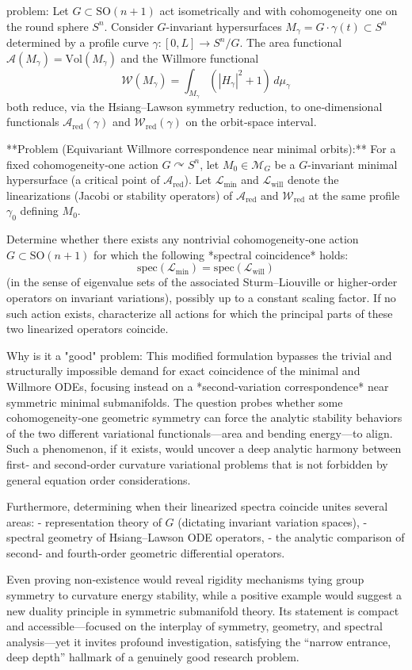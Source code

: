 problem:  
Let \(G \subset \mathrm{SO}(n+1)\) act isometrically and with cohomogeneity one on the round sphere \(S^n\).  
Consider \(G\)-invariant hypersurfaces \(M_\gamma = G\cdot \gamma(t)\subset S^n\) determined by a profile curve \(\gamma: [0,L]\to S^n/G\).  
The area functional \(\mathcal{A}(M_\gamma)=\mathrm{Vol}(M_\gamma)\) and the Willmore functional  
\[
\mathcal{W}(M_\gamma)=\int_{M_\gamma} (|H_\gamma|^2+1)\, d\mu_\gamma
\]
both reduce, via the Hsiang–Lawson symmetry reduction, to one‑dimensional functionals \(\mathcal{A}_\mathrm{red}(\gamma)\) and \(\mathcal{W}_\mathrm{red}(\gamma)\) on the orbit‑space interval.

**Problem (Equivariant Willmore correspondence near minimal orbits):**  
For a fixed cohomogeneity‑one action \(G\curvearrowright S^n\), let \(M_0 \in \mathcal{M}_G\) be a \(G\)-invariant minimal hypersurface (a critical point of \(\mathcal{A}_\mathrm{red}\)).  
Let \(\mathcal{L}_\mathrm{min}\) and \(\mathcal{L}_\mathrm{will}\) denote the linearizations (Jacobi or stability operators) of \(\mathcal{A}_\mathrm{red}\) and \(\mathcal{W}_\mathrm{red}\) at the same profile \(\gamma_0\) defining \(M_0\).

Determine whether there exists any nontrivial cohomogeneity‑one action \(G\subset \mathrm{SO}(n+1)\) for which the following *spectral coincidence* holds:
\[
\mathrm{spec}(\mathcal{L}_\mathrm{min}) = \mathrm{spec}(\mathcal{L}_\mathrm{will})
\]
(in the sense of eigenvalue sets of the associated Sturm–Liouville or higher‑order operators on invariant variations), possibly up to a constant scaling factor.  
If no such action exists, characterize all actions for which the principal parts of these two linearized operators coincide.  

Why is it a "good" problem:  
This modified formulation bypasses the trivial and structurally impossible demand for exact coincidence of the minimal and Willmore ODEs, focusing instead on a *second‑variation correspondence* near symmetric minimal submanifolds.  The question probes whether some cohomogeneity‑one geometric symmetry can force the analytic stability behaviors of the two different variational functionals—area and bending energy—to align.  
Such a phenomenon, if it exists, would uncover a deep analytic harmony between first‑ and second‑order curvature variational problems that is not forbidden by general equation order considerations.  

Furthermore, determining when their linearized spectra coincide unites several areas:
- representation theory of \(G\) (dictating invariant variation spaces),
- spectral geometry of Hsiang–Lawson ODE operators,
- the analytic comparison of second‑ and fourth‑order geometric differential operators.  

Even proving non‑existence would reveal rigidity mechanisms tying group symmetry to curvature energy stability, while a positive example would suggest a new duality principle in symmetric submanifold theory.  
Its statement is compact and accessible—focused on the interplay of symmetry, geometry, and spectral analysis—yet it invites profound investigation, satisfying the “narrow entrance, deep depth” hallmark of a genuinely good research problem.